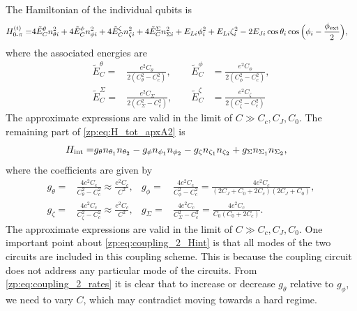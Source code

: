\begin{widetext}
The Hamiltonian of the individual \zps qubits is
\begin{align}
    H_{0\text{-}\pi}^{(i)} =&  4\tilde E_C^{\theta} n_{\theta i}^2 + 4\tilde E_C^{\phi} n_{\phi i}^2  + 4 \tilde E_C^{\zeta} n_{\zeta i}^2 + 4\tilde E_C^{\Sigma} n_{\Sigma i}^2 +
    E_{Li}\phi_i^2 + E_{Li}\zeta_i^2 - 2E_{Ji}\cos{\theta_i}\cos{\Big(\phi_i - \frac{\phi_{\rm ext}}{2}\Big)} ,
\end{align}
where the associated energies are
\begin{subequations}
\begin{align}
    \tilde E_{C}^{\theta} =& \frac{e^2C_\theta}{2(C_{\theta}^2 - C_c^2)},
    &\tilde E_{C}^{\phi} &= \frac{e^2C_\phi}{2(C_{\phi}^2 - C_c^2)} ,
    \\
    \tilde E_{C}^{\Sigma} =& \frac{e^2C_\Sigma}{2(C_{\Sigma}^2 - C_c^2)}
    ,\;\;\;\;
    &\tilde E_{C}^{\zeta} &= \frac{e^2C_\zeta}{2(C_{\zeta}^2 - C_c^2)}
\end{align}
\end{subequations}
The approximate expressions are valid in the limit of $C\gg C_c,C_J,C_0$.
The remaining part of \cref{zp:eq:H_tot_apxA2} is
\begin{align}\label{zp:eq:coupling_2_Hint}
    H_{\rm int} =& g_{\theta} n_{\theta_1}n_{\theta_2}
    - g_{\phi} n_{\phi_1}n_{\phi_2}
    - g_{\zeta} n_{\zeta_1}n_{\zeta_2}
    + g_{\Sigma} n_{\Sigma_1}n_{\Sigma_2},
\end{align}
where the coefficients are given by
\begin{subequations}\label{zp:eq:coupling_2_rates}
\begin{align}
    g_{\theta} =&\frac{4e^2C_c}{C_{\theta}^2 - C_c^2} \approx \frac{e^2C_c}{C^2},
    & g_{\phi} =&\frac{4e^2C_c}{C_{\phi}^2 - C_c^2} = \frac{4e^2C_c}{(2C_J+C_0+2C_c) (2C_J+C_0)} ,
    \\
    g_{\zeta} =&\frac{4e^2C_c}{C_{\zeta}^2 - C_c^2} \approx \frac{e^2C_c}{C^2},
    &g_{\Sigma} =& \frac{4e^2C_c}{C_{\Sigma}^2 - C_c^2} =  \frac{4e^2C_c}{C_0(C_0+2C_c)}.
\end{align}
\end{subequations}
The approximate expressions are valid in the limit of $C\gg C_c,C_J,C_0$.
One important point about \cref{zp:eq:coupling_2_Hint} is that all modes of the two \zps circuits are included in this coupling scheme.
This is because the coupling circuit does not address any particular mode of the circuits.
From \cref{zp:eq:coupling_2_rates} it is clear that to increase or decrease $g_\theta$ relative to  $g_\phi$, we need to vary $C$, which may contradict moving towards a hard \zps regime.


\end{widetext}
